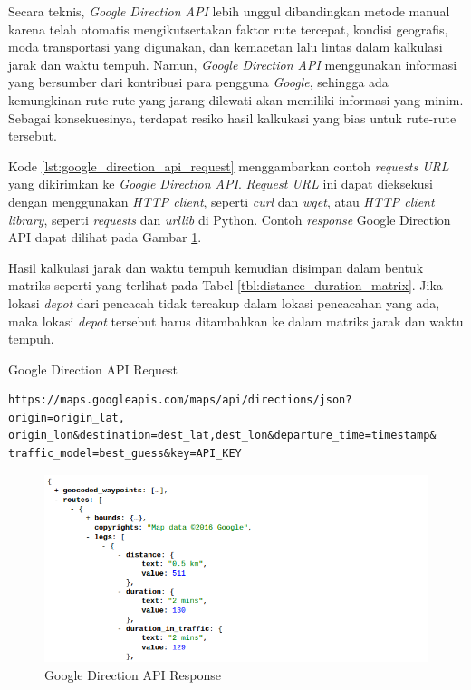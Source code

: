 Secara teknis, \textit{Google Direction API} lebih unggul dibandingkan metode manual karena telah otomatis mengikutsertakan faktor rute tercepat, kondisi geografis, moda transportasi yang digunakan, dan kemacetan lalu lintas dalam kalkulasi jarak dan waktu tempuh. Namun, \textit{Google Direction API} menggunakan informasi yang bersumber dari kontribusi para pengguna \textit{Google}, sehingga ada kemungkinan rute-rute yang jarang dilewati akan memiliki informasi yang minim. Sebagai konsekuesinya, terdapat resiko hasil kalkukasi yang bias untuk rute-rute tersebut. 


Kode \autoref{lst:google_direction_api_request} menggambarkan contoh \textit{requests URL} yang dikirimkan ke \textit{Google Direction API}. \textit{Request URL} ini dapat dieksekusi dengan menggunakan \textit{HTTP client}, seperti \textit{curl} dan \textit{wget}, atau \textit{HTTP client library}, seperti \textit{requests} dan \textit{urllib} di Python. Contoh \textit{response} Google Direction API dapat dilihat pada Gambar \ref{fig:google_direction_api_response}.


Hasil kalkulasi jarak dan waktu tempuh kemudian disimpan dalam bentuk matriks seperti yang terlihat pada Tabel \ref{tbl:distance_duration_matrix}. Jika lokasi \textit{depot} dari pencacah tidak tercakup dalam lokasi pencacahan yang ada, maka lokasi \textit{depot} tersebut harus ditambahkan ke dalam matriks jarak dan waktu tempuh.


\begin{listing}[!]
	\caption{Google Direction API Request}
	\label{lst:google_direction_api_request}
	\begin{verbatim}
https://maps.googleapis.com/maps/api/directions/json?origin=origin_lat,
origin_lon&destination=dest_lat,dest_lon&departure_time=timestamp&
traffic_model=best_guess&key=API_KEY
	\end{verbatim}
\end{listing}


\begin{figure}[!]
	\centering
	\includegraphics[width=\textwidth]{Resources/Images/google_direction_api_response}
	\caption{Google Direction API Response}
	\label{fig:google_direction_api_response}
\end{figure}


